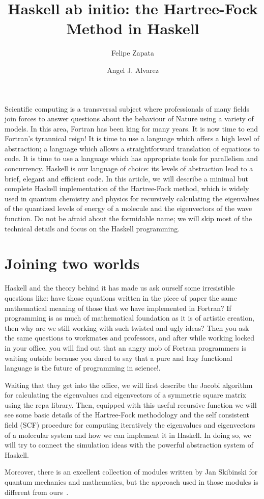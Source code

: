 \documentclass{tmr}
\title{Haskell ab initio: the Hartree-Fock Method in Haskell}
\author{Felipe Zapata\email{felipe.zapata@edu.uah.es}}
\author{Angel J. Alvarez\email{a.alvarez@uah.es}}
\begin{document}
\begin{introduction}

Scientific computing is a transversal subject where professionals of
many fields join forces to answer questions about the behaviour of
Nature using a variety of models.
%
In this area, Fortran has been king for many years.
%
It is now time to end Fortran's tyrannical reign!
%
It is time to use a language which offers a high level of abstraction; a
language which allows a straightforward translation of equations to code.
%
It is time to use a language which has appropriate tools for parallelism
and concurrency.
%
Haskell is our language of choice: its levels of abstraction lead to a
brief, elegant and efficient code.
%
In this article, we will describe a minimal but complete Haskell
implementation of the Hartree-Fock method, which is widely used in
quantum chemistry and physics for recursively calculating the
eigenvalues of the quantized levels of energy of a molecule and the
eigenvectors of the wave function.
%
Do not be afraid about the formidable name; we will skip most of the
technical details and focus on the Haskell programming.

\end{introduction}


\section{Joining two worlds}

Haskell and the theory behind it has made us 
ask ourself some irresistible questions like: have those equations written in the
piece of paper the same mathematical meaning of those that we 
have implemented in Fortran? If programming is as much of mathematical
foundation as it is of artistic creation, then why are we still working
with such twisted and ugly ideas? Then you ask the same questions to workmates
and professors, and after while working locked in your
office, you will find out that an angry mob of Fortran programmers is waiting outside
 because you dared to say that a pure and lazy functional language is the future of 
programming in science!. 

Waiting that they get into the office, we will first describe 
the Jacobi algorithm for calculating the eigenvalues
and eigenvectors of a symmetric square matrix using the repa 
library. Then, equipped with this useful recursive function 
we will see some basic details of the Hartree-Fock methodology and
the self consistent field (SCF) procedure for computing iteratively the eigenvalues
and eigenvectors of a molecular system and how we can implement
it in Haskell. In doing so, we will try to connect the simulation ideas with 
the powerful abstraction system of Haskell.
\par Moreover, there is an excellent collection of modules written by 
Jan Skibinski for quantum mechanics and mathematics, but the approach used
in those modules is different from ours~\cite{Skibinski}.
\end{document}

